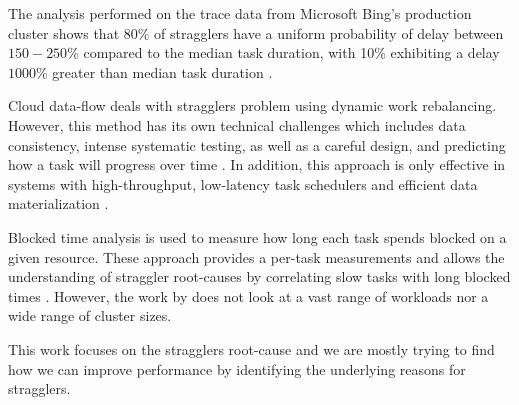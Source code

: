 The analysis performed on the trace data from Microsoft Bing's production cluster shows that $80\%$ of stragglers have a uniform probability of delay between $150-250\%$ 
compared to the median task duration, with 10\% exhibiting a delay $1000\%$ greater than median task duration \cite{Ananthanarayanan2010}.

Cloud data-flow deals with stragglers problem using dynamic work rebalancing. 
However, this method has its own technical challenges which includes data consistency, intense systematic testing, as well as a careful design, and predicting how a task will progress over time \cite{Schmidt2016}.
In addition, this approach is only effective in systems with high-throughput, low-latency task schedulers and efficient data materialization \cite{Rose2012}.

Blocked time analysis is used to measure how long each task spends blocked on a given resource. 
These approach provides a per-task measurements and allows the understanding of  straggler root-causes by correlating slow tasks with long blocked times \cite{Ousterhout2015}. 
However, the work by \cite{Ousterhout2015} does not look at a vast range of workloads nor a wide range of cluster sizes.

This work focuses on the stragglers root-cause and we are mostly trying to find how we can improve performance by identifying the underlying reasons for stragglers.


